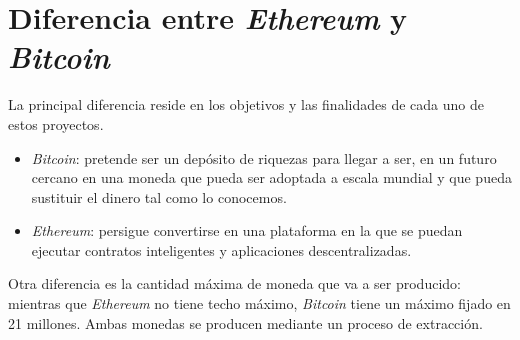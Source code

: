 \section{Diferencia entre \textit{Ethereum} y \textit{Bitcoin}}
La principal diferencia\cite{dif:Ethereum:Bitcoin} reside en los objetivos y las finalidades de cada uno de estos proyectos.

\begin{itemize}
	\item \textit{Bitcoin}: pretende ser un depósito de riquezas para llegar a ser, en un futuro cercano en una moneda que pueda ser adoptada a escala mundial y que pueda sustituir el dinero tal como lo conocemos.
	
	\item \textit{Ethereum}: persigue convertirse en una plataforma en la que se puedan ejecutar contratos inteligentes y aplicaciones descentralizadas.
\end{itemize}

Otra diferencia es la cantidad máxima de moneda que va a ser producido: mientras que \textit{Ethereum} no tiene techo máximo, \textit{Bitcoin} tiene un máximo fijado en 21 millones. Ambas monedas se producen mediante un proceso de extracción.